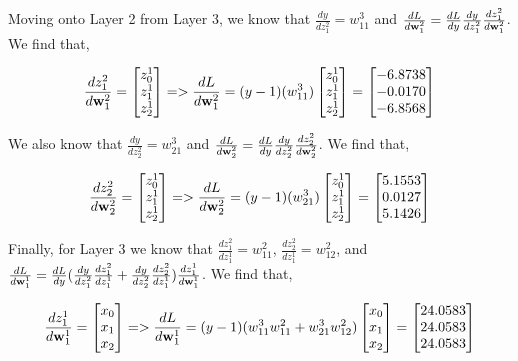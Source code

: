 \documentclass[12pt, fullpage,letterpaper]{article}
\begin{document}
\begin{enumerate}
	Moving onto Layer 2 from Layer 3, we know that $\frac{dy}{dz^2_1} = w^3_{11}$ and $\frac{dL}{d{\bf w}^2_1} = \frac{dL}{dy} \frac{dy}{dz^2_1} \frac{dz^2_1} {d{\bf w}^2_1}$. We find that,
	
	\[
	    \frac{dz^2_1}{d{\bf w}^2_1} = \begin{bmatrix}
	        z^1_0 \\
	        z^1_1 \\
	        z^1_2
	    \end{bmatrix} => \frac{dL}{d{\bf w}^2_1} = (y - 1) (w^3_{11}) \begin{bmatrix}
	        z^1_0 \\
	        z^1_1 \\
	        z^1_2
	    \end{bmatrix} = \begin{bmatrix}
	        -6.8738 \\
	        -0.0170 \\
	        -6.8568
	    \end{bmatrix}
	\]
	
	We also know that $\frac{dy}{dz^2_2} = w^3_{21}$ and $\frac{dL}{d{\bf w}^2_2} = \frac{dL}{dy} \frac{dy}{dz^2_2} \frac{dz^2_2} {d{\bf w}^2_2}$. We find that,
	
	\[
	    \frac{dz^2_2}{d{\bf w}^2_2} = \begin{bmatrix}
	        z^1_0 \\
	        z^1_1 \\
	        z^1_2
	    \end{bmatrix} => \frac{dL}{d{\bf w}^2_2} = (y - 1) (w^3_{21}) \begin{bmatrix}
	        z^1_0 \\
	        z^1_1 \\
	        z^1_2
	    \end{bmatrix} = \begin{bmatrix}
	        5.1553 \\
	        0.0127 \\
	        5.1426
	    \end{bmatrix}
	\]
	
	Finally, for Layer 3 we know that $\frac{dz^2_1}{dz^1_1} = w^2_{11}$, $\frac{dz^2_2}{dz^1_1} = w^2_{12}$, and $\frac{dL}{d{\bf w}^1_1} = \frac{dL}{dy} (\frac{dy}{dz^2_1} \frac{dz^2_1}{dz^1_1} + \frac{dy}{dz^2_2} \frac{dz^2_2}{dz^1_1}) \frac{dz^1_1} {d{\bf w}^1_1}$. We find that,
	
	\[
	    \frac{dz^1_1}{d{\bf w}^1_1} = \begin{bmatrix}
	        x_0 \\
	        x_1 \\
	        x_2
	    \end{bmatrix} => \frac{dL}{d{\bf w}^1_1} = (y - 1) (w^3_{11} w^2_{11} + w^3_{21} w^2_{12}) \begin{bmatrix}
	        x_0 \\
	        x_1 \\
	        x_2
	    \end{bmatrix} = \begin{bmatrix}
	        24.0583 \\
	        24.0583 \\
	        24.0583
	    \end{bmatrix}
	\]
	

\end{enumerate}
\end{document}

